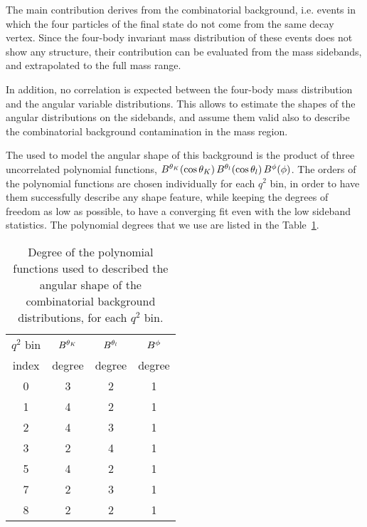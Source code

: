 The main contribution derives from the combinatorial background, i.e. events in which the four particles of the final state do not come from the same decay vertex.
Since the four-body invariant mass distribution of these events does not show any structure, their contribution can be evaluated from the mass sidebands, and extrapolated to the full mass range.

In addition, no correlation is expected between the four-body mass distribution and the angular variable distributions.
This allows to estimate the shapes of the angular distributions on the sidebands, and assume them valid also to describe the combinatorial background contamination in the \PBz mass region.

The \pdf used to model the angular shape of this background is the product of three uncorrelated polynomial functions, $B^{\theta_K}(\cos\theta_K) \, B^{\theta_l}(\cos\theta_l) \, B^{\phi}(\phi)$.
The orders of the polynomial functions are chosen individually for each $q^2$ bin, in order to have them successfully describe any shape feature, while keeping the degrees of freedom as low as possible, to have a converging fit even with the low sideband statistics.
The polynomial degrees that we use are listed in the Table~\ref{tab:back-degree}.

\begin{table}[!htb]
  \begin{center}
    \caption{Degree of the polynomial functions used to described the angular shape of the combinatorial background distributions, for each $q^2$ bin.
      \label{tab:back-degree}}
    \begin{tabular}{c|c|c|c}
      $q^2$ bin & $B^{\theta_K}$ & $B^{\theta_l}$ & $B^{\phi}$ \\
      index & degree & degree & degree \\
      \hline
      0 & 3 & 2 & 1 \\
      1 & 4 & 2 & 1 \\
      2 & 4 & 3 & 1 \\
      3 & 2 & 4 & 1 \\
      5 & 4 & 2 & 1 \\
      7 & 2 & 3 & 1 \\
      8 & 2 & 2 & 1 \\
    \end{tabular}
  \end{center}
\end{table}

